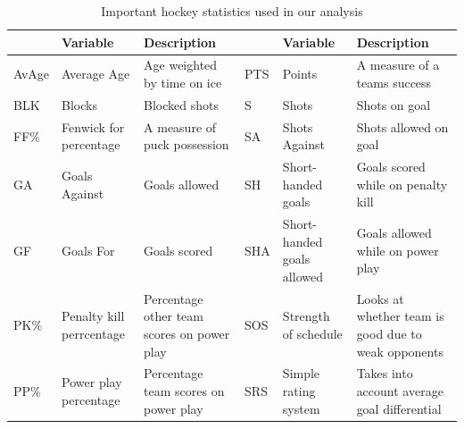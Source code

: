 \documentclass[12pt]{article}
\begin{document}
\begin{table}[ht]
\small
\def\arraystretch{1.2}
\centering
\begin{tabular}{p{1.2cm} p{2.2cm} p{3.5cm} |p{1.2cm} p{2.5cm} p{3.8cm}}
\hline
 & Variable & Description & & Variable & Description\\ \hline
AvAge & Average Age & Age weighted by time on ice & PTS & Points & A measure of a teams success \\ \hline
BLK & Blocks & Blocked shots & S & Shots & Shots on goal \\ \hline
FF\% & Fenwick for percentage & A measure of puck possession & SA & Shots Against & Shots allowed on goal \\ \hline 
GA & Goals Against & Goals allowed & SH & Short-handed goals & Goals scored while on penalty kill \\ \hline
GF & Goals For & Goals scored & SHA & Short-handed goals allowed & Goals allowed while on power play \\ \hline
PK\% & Penalty kill perrcentage & Percentage other team scores on power play & SOS & Strength of schedule & Looks at whether team is good due to weak opponents \\ \hline
PP\% & Power play percentage & Percentage team scores on power play & SRS & Simple rating system & Takes into account average goal differential \\ \hline
\end{tabular} 
\caption{Important hockey statistics used in our analysis}
\end{table}
\end{document}
